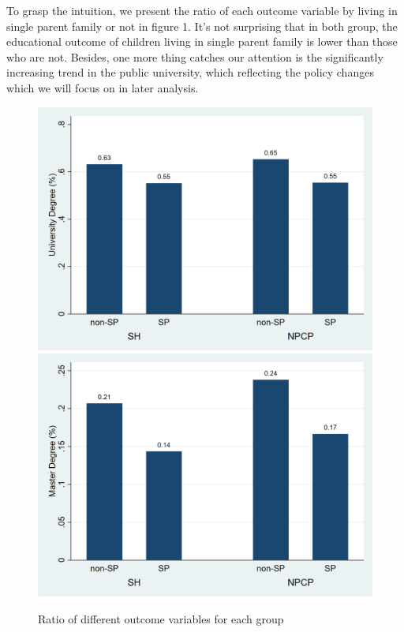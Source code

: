 \documentclass[]{AEA}
\begin{document}
    To grasp the intuition, we present the ratio of each outcome variable by living in single parent family or not in figure 1.  It's not surprising that in both group, the educational outcome of children living in single parent family is lower than those who are not.  Besides, one more thing catches our attention is the significantly increasing trend in the public university, which reflecting the policy changes which we will focus on in later analysis.

    \begin{figure}
        \caption{Ratio of different outcome variables for each group}
        \includegraphics[scale=0.13]{university_sp.png}
        \includegraphics[scale=0.13]{master_sp.png}

\end{figure}
\end{document}
